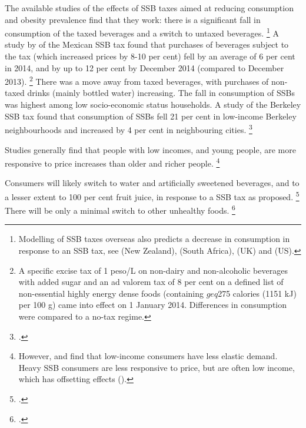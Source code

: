 \documentclass[embargoed]{grattan}
\begin{document}
The available studies of the effects of SSB taxes aimed at reducing consumption and obesity prevalence find that they work: there is a significant fall in consumption of the taxed beverages and a switch to untaxed beverages.%
\footnote{Modelling of SSB taxes overseas also predicts a decrease in consumption in response to an SSB tax, see \textcite{NiMhurchu2014Twentypercenttax} (New Zealand), \textcite{Manyema2014potentialimpact20} (South Africa), \textcite{Briggs2013Overallincomespecific} (UK) and \textcite{Long2015Costeffectivenesssugar} (US).} A study by \textcite{Colchero2016Beveragepurchasesstores} of the Mexican SSB tax found that purchases of beverages subject to the tax (which increased prices by 8-10 per cent) fell by an average of 6 per cent in 2014, and by up to 12 per cent by December 2014 (compared to December 2013).%
\footnote{A specific excise tax of 1 peso/L on non-dairy and non-alcoholic beverages with added sugar and an ad valorem tax of 8 per cent on a defined list of non-essential highly energy dense foods (containing $geq$275 calories (1151 kJ) per 100 g) came into effect on 1 January 2014.
Differences in consumption were compared to a no-tax regime.} There was a move away from taxed beverages, with purchases of non-taxed drinks (mainly bottled water) increasing.
The fall in consumption of SSBs was highest among low socio-economic status households.
A study of the Berkeley SSB tax found that consumption of SSBs fell 21 per cent in low-income Berkeley neighbourhoods and increased by 4 per cent in neighbouring cities.%
\footcite{Falbe2016ImpactBerkeleyExcise}

Studies generally find that people with low incomes, and young people, are more responsive to price increases than older and richer people.%
\footnote{\textcites{Yang2016child}{Colchero2016Beveragepurchasesstores}{Organization2016FiscalPoliciesDiet}{Batis2016FirstYearEvaluation}{Sharma2014effectstaxingsugarsweetened}{Coalition2016Policybriefcase}{Friedman2012Sugarsweetenedbeverage}{Clements2015PriceElasticitiesFood} However, \textcite{Finkelstein2010EconomicsObesity} and \textcite{Lin2011Measuringweightoutcomes} find that low-income consumers have less elastic demand.
Heavy SSB consumers are less responsive to price, but are often low income, which has offsetting effects (\textcites{Organization2016FiscalPoliciesDiet}{Etile2015DoHighConsumers}).}

Consumers will likely switch to water and artificially sweetened beverages, and to a lesser extent to 100 per cent fruit juice, in response to a SSB tax as proposed.%
\footcites{Finkelstein2013Implicationssugarsweetened}{Colchero2016Beveragepurchasesstores}{LeBodo2016CanadianSodaTax}{Briggs2013Overallincomespecific} There will be only a minimal switch to other unhealthy foods.%
\footcite{Finkelstein2013Implicationssugarsweetened}
\end{document}
